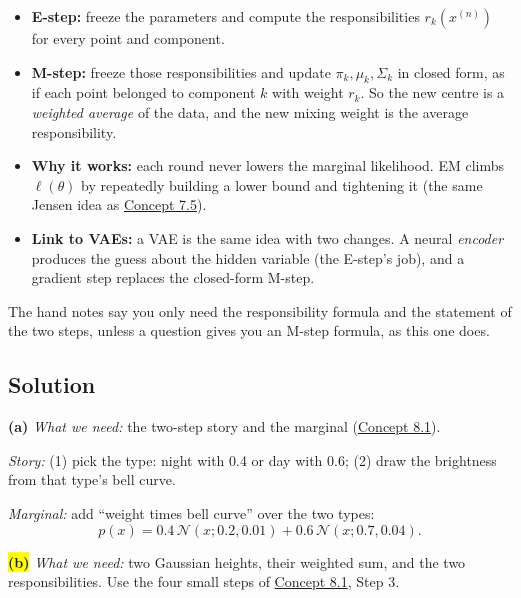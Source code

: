 \documentclass[12pt,a4paper]{article}
\begin{document}
\begin{itemize}[nosep]
  \item \textbf{E-step:} freeze the parameters and compute the responsibilities $r_k(x^{(n)})$ for every point and component.
  \item \textbf{M-step:} freeze those responsibilities and update $\pi_k,\mu_k,\Sigma_k$ in closed form, as if each point belonged to component $k$ with weight $r_k$. So the new centre is a \emph{weighted average} of the data, and the new mixing weight is the average responsibility.
  \item \textbf{Why it works:} each round never lowers the marginal likelihood. EM climbs $\ell(\theta)$ by repeatedly building a lower bound and tightening it (the same Jensen idea as \hyperref[c7-5]{Concept 7.5}).
  \item \textbf{Link to VAEs:} a VAE is the same idea with two changes. A neural \emph{encoder} produces the guess about the hidden variable (the E-step's job), and a gradient step replaces the closed-form M-step.
\end{itemize}
The hand notes say you only need the responsibility formula and the statement of the two steps, unless a question gives you an M-step formula, as this one does.

\subsection{Solution}

\textbf{(a)} \emph{What we need:} the two-step story and the marginal (\hyperref[c8-1]{Concept 8.1}).

\emph{Story:} (1) pick the type: night with 0.4 or day with 0.6; (2) draw the brightness from that type's bell curve.

\emph{Marginal:} add ``weight times bell curve'' over the two types:
\[
p(x)=0.4\,\mathcal{N}(x;0.2,0.01)+0.6\,\mathcal{N}(x;0.7,0.04).
\]

\colorbox{yellow}{\textbf{(b)}} \emph{What we need:} two Gaussian heights, their weighted sum, and the two responsibilities. Use the four small steps of \hyperref[c8-1]{Concept 8.1}, Step 3.
\end{document}
